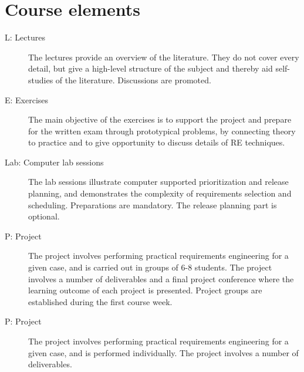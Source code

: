 \section{Course elements}
\begin{description}
\item[L: Lectures] The lectures provide an overview of the literature. They do not cover every detail, but give a high-level structure of the subject and thereby aid self-studies of the literature. Discussions are promoted.
\item[E: Exercises] The main objective of the exercises is to support the project and prepare for the written exam through prototypical problems, by connecting theory to practice and to give opportunity to discuss details of RE techniques.
\item[Lab: Computer lab sessions] The lab sessions illustrate computer supported
prioritization and release planning, and demonstrates the complexity of requirements selection and scheduling. Preparations are mandatory. %
\ifteknolog\else
The release planning part is optional.
\fi
\ifteknolog
	\item[P: Project] The project involves performing practical requirements engineering for a given case, and is carried out in groups of 6-8 students. The project involves a number of deliverables and a final project conference where the learning outcome of each project is presented. Project groups are established during the first course week.
\else
	\item[P: Project] The project involves performing practical requirements engineering for a given case, and is performed individually. The project involves a number of deliverables.
\fi

\end{description}




